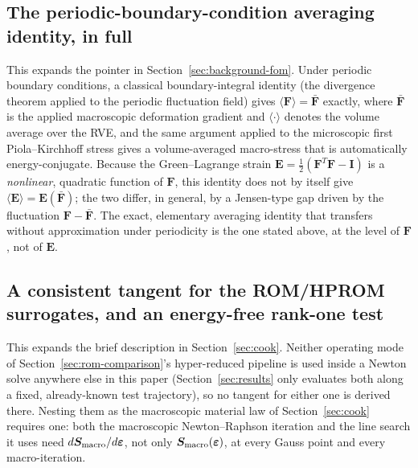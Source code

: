 \documentclass[10pt,a4paper]{article}
\begin{document}
\subsection{The periodic-boundary-condition averaging identity, in full}
\label{app:periodicity}
This expands the pointer in Section~\ref{sec:background-fom}. Under
periodic boundary conditions, a classical boundary-integral identity
(the divergence theorem applied to the periodic fluctuation field)
gives $\langle\bm F\rangle=\bar{\bm F}$ exactly, where $\bar{\bm F}$ is
the applied macroscopic deformation gradient and $\langle\cdot\rangle$
denotes the volume average over the RVE, and the same argument applied
to the microscopic first Piola--Kirchhoff stress gives a
volume-averaged macro-stress that is automatically energy-conjugate.
Because the Green--Lagrange strain $\bm E=\tfrac12(\bm F^T\bm F-\bm I)$
is a \emph{nonlinear}, quadratic function of $\bm F$, this identity
does not by itself give $\langle\bm E\rangle=\bm E(\bar{\bm F})$; the
two differ, in general, by a Jensen-type gap driven by the fluctuation
$\bm F-\bar{\bm F}$. The exact, elementary averaging identity that
transfers without approximation under periodicity is the one stated
above, at the level of $\bm F$, not of $\bm E$.

\subsection{A consistent tangent for the ROM/HPROM surrogates, and an energy-free rank-one test}
\label{app:consistent-tangent}
This expands the brief description in Section~\ref{sec:cook}. Neither
operating mode of Section~\ref{sec:rom-comparison}'s hyper-reduced pipeline
is used inside a Newton solve anywhere else in this paper
(Section~\ref{sec:results} only evaluates both along a fixed, already-known
test trajectory), so no tangent for either one is derived there.
Nesting them as the macroscopic material law of Section~\ref{sec:cook}
requires one: both the macroscopic Newton--Raphson iteration and the line
search it uses need $d\bm S_{\rm macro}/d\bm\varepsilon$, not only $\bm
S_{\rm macro}(\bm\varepsilon)$, at every Gauss point and every
macro-iteration.
\end{document}
